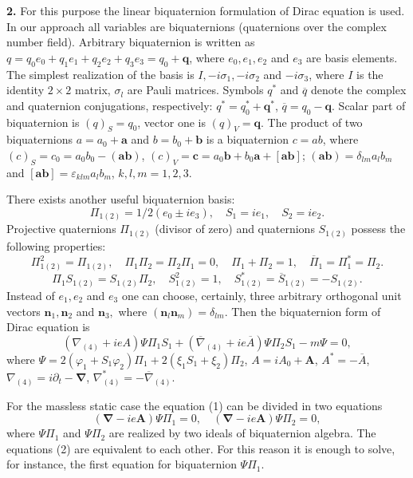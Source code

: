 \documentclass[12pt,a4paper]{article}
\begin{document}
{\bf 2.} For this purpose the linear biquaternion formulation of Dirac equation
\cite{Berezin} is used. In our approach all variables are biquaternions
(quaternions over the complex number field). Arbitrary biquaternion is
written as $q=q_0e_0+q_1e_1+q_2e_2+q_3e_3=q_0+\mathbf{q}$,
where $e_0, e_1, e_2$ and $e_3$ are basis elements.
The simplest realization of the basis is $I, -i\sigma_1, -i\sigma_2$ and $-i\sigma_3$,
where $I$ is the identity $2\times 2$ matrix, $\sigma_l$ are Pauli matrices.
Symbols $q^*$ and $\overline{q}$ denote the complex and quaternion
conjugations, respectively: $q^*=q_{0}^{*}+\mathbf{q}^*$, $\overline{q}=q_0-\mathbf{q}$.
Scalar part of biquaternion is $(q)_S=q_0$, vector one is $(q)_V=\mathbf{q}$.
The product of two biquaternions $a=a_0+\mathbf{a}$ and $b=b_0+\mathbf{b}$ is a
biquaternion $c=ab$, where
$(c)_S=c_0=a_0b_0-(\mathbf{a}\mathbf{b})$,
$(c)_V=\mathbf{c}=a_0\mathbf{b}+b_0\mathbf{a}+[\mathbf{a}\mathbf{b}]$;
$(\mathbf{a}\mathbf{b})=\delta_{lm}a_lb_m$ and
$[\mathbf{a}\mathbf{b}]=\varepsilon_{klm}a_lb_m$, $k,l,m= 1,2,3$.

There exists another useful biquaternion basis:
$$\Pi_{1(2)}=1/2(e_0\pm ie_3), \quad S_1=ie_1, \quad S_2=ie_2.$$
Projective quaternions $\Pi_{1(2)}$ (divisor of zero) and
quaternions $S_{1(2)}$ possess the following properties:
$$\Pi^{2}_{1(2)}=\Pi_{1(2)}, \quad \Pi_{1}\Pi_{2}=\Pi_{2}\Pi_{1}=0, \quad \Pi_{1}+\Pi_{2}=1,
\quad \overline{\Pi}_{1}=\Pi^{*}_{1}=\Pi_{2}.$$
$$\Pi_{1}S_{1(2)}=S_{1(2)}\Pi_{2}, \quad S_{1(2)}^{2}=1, \quad
S_{1(2)}^{*}=\overline{S}_{1(2)}=-S_{1(2)}.$$
Instead of $e_1, e_2$ and $e_3$ one
can choose, certainly, three arbitrary orthogonal unit
vectors $\mathbf{n}_1, \mathbf{n}_2$ and $\mathbf{n}_3,$ where
$(\mathbf{n}_l\mathbf{n}_m)=\delta_{lm}$.
Then the biquaternion form of Dirac equation \cite{Berezin} is
\begin{equation}
(\nabla_{(4)}+ieA)\Psi \Pi_{1}S_1+(\overline{\nabla}_{(4)}+ie\overline{A})\Psi \Pi_{2}S_1-m\Psi
=0,
\end{equation}
where $\Psi=2(\varphi_1+S_1\varphi_2)\Pi_1+2(\xi_1S_1+\xi_2)\Pi_2$,
$A=iA_0+\mathbf{A}$, $A^*=-\overline{A}$,
$\nabla_{(4)}=i\partial_{t}-\mathbf{\nabla}$, $\nabla_{(4)}^{*}=-\overline{\nabla}_{(4)}$.

For the massless static case the equation (1) can be divided in two equations
\begin{equation}
(\mathbf{\nabla}-ie\mathbf{A})\Psi \Pi_1=0, \quad
(\mathbf{\nabla}-ie\mathbf{A})\Psi \Pi_2=0,
\end{equation}
where $\Psi \Pi_1$ and $\Psi \Pi_2$ are realized by two ideals of biquaternion
algebra.
The equations (2) are equivalent to each other. For this reason it is
enough to solve, for instance, the first equation for biquaternion $\Psi \Pi_1$.
\end{document}
